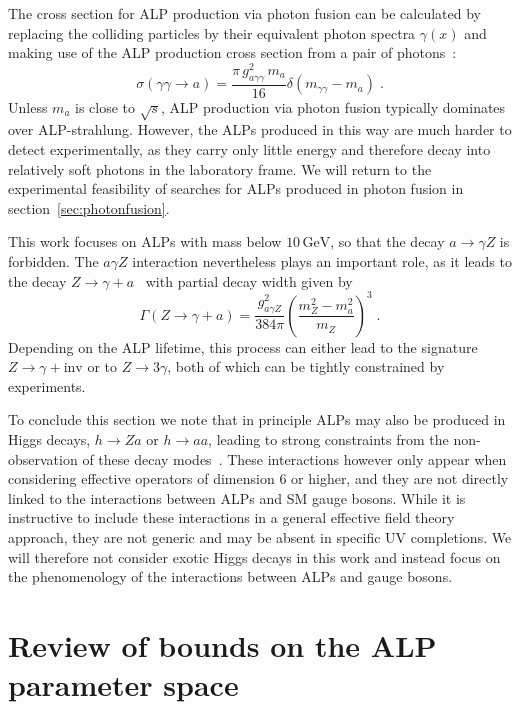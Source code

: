 \documentclass[11pt,a4paper]{article}
\newcommand{\ga}{g_{a\gamma\gamma}}
\begin{document}
The cross section for ALP production via photon fusion can be calculated by replacing the colliding particles by their equivalent photon spectra $\gamma(x)$ and making use of the ALP production cross section from a pair of photons~\cite{Dobrich:2015jyk}:
\begin{equation}
 \sigma(\gamma \gamma \rightarrow a) = \frac{\pi\,\ga^2\,m_a}{16} \delta(m_{\gamma\gamma} - m_a) \; .
\end{equation}
Unless $m_a$ is close to $\sqrt{s}$, ALP production via photon fusion typically dominates over ALP-strahlung. However, the ALPs produced in this way are much harder to detect experimentally, as they carry only little energy and therefore decay into relatively soft photons in the laboratory frame. We will return to the experimental feasibility of searches for ALPs produced in photon fusion in section~\ref{sec:photonfusion}.

This work focuses on ALPs with mass below $10\,\mathrm{GeV}$, so that the decay $a \to \gamma Z$ is forbidden. The $a\gamma Z$ interaction nevertheless plays an important role, as it leads to the decay $Z \to \gamma + a$~\cite{Dror:2017nsg,Bauer:2017ris} with partial decay width given by
\begin{equation}
\Gamma(Z \to \gamma + a) = \frac{g_{a\gamma Z}^2}{384 \pi} \left(\frac{m_Z^2 - m_a^2}{m_Z}\right)^3\; .
\end{equation}
Depending on the ALP lifetime, this process can either lead to the signature $Z \to \gamma + \text{inv}$ or to $Z \to 3\gamma$, both of which can be tightly constrained by experiments.

To conclude this section we note that in principle ALPs may also be produced in Higgs decays, $h \to Z a$ or $h \to a a$, leading to strong constraints from the non-observation of these decay modes~\cite{Bauer:2017nlg,Bauer:2017ris}. These interactions however only appear when considering effective operators of dimension 6 or higher, and they are not directly linked to the interactions between ALPs and SM gauge bosons. While it is instructive to include these interactions in a general effective field theory approach, they are not generic and may be absent in specific UV completions. We will therefore not consider exotic Higgs decays in this work and instead focus on the phenomenology of the interactions between ALPs and gauge bosons.

\section{Review of bounds on the ALP parameter space}
\label{sec:review}
\end{document}
